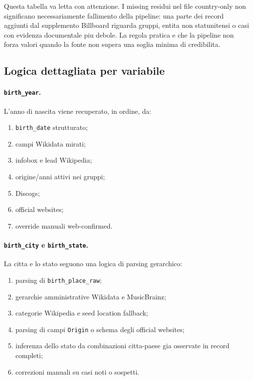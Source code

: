 \documentclass[11pt]{article}
\begin{document}


Questa tabella va letta con attenzione. I missing residui nel file country-only non significano necessariamente fallimento della pipeline: una parte dei record aggiunti dal supplemento Billboard riguarda gruppi, entita non statunitensi o casi con evidenza documentale piu debole. La regola pratica e che la pipeline non forza valori quando la fonte non supera una soglia minima di credibilita.

\subsection{Logica dettagliata per variabile}
\paragraph{\texttt{birth\_year}.}
L'anno di nascita viene recuperato, in ordine, da:
\begin{enumerate}[leftmargin=2em]
\item \texttt{birth\_date} strutturato;
\item campi Wikidata mirati;
\item infobox e lead Wikipedia;
\item origine/anni attivi nei gruppi;
\item Discogs;
\item official websites;
\item override manuali web-confirmed.
\end{enumerate}

\paragraph{\texttt{birth\_city} e \texttt{birth\_state}.}
La citta e lo stato seguono una logica di parsing gerarchico:
\begin{enumerate}[leftmargin=2em]
\item parsing di \texttt{birth\_place\_raw};
\item gerarchie amministrative Wikidata e MusicBrainz;
\item categorie Wikipedia e seed location fallback;
\item parsing di campi \texttt{Origin} o schema degli official websites;
\item inferenza dello stato da combinazioni citta-paese gia osservate in record completi;
\item correzioni manuali su casi noti o sospetti.
\end{enumerate}
\end{document}
